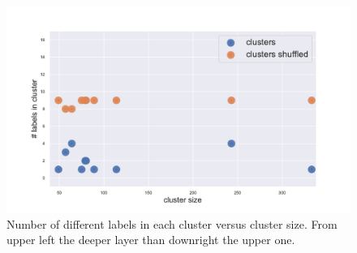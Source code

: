 \begin{figure}[htb!]
\begin{minipage}{0.45\textwidth}
    \end{minipage}
    \hspace{3mm}
    \begin{minipage}{0.45\textwidth}
    \includegraphics[width=0.9\linewidth]{pictures/topic/gtex/oversigma_10tissue/shuffledcluster_shuffle_label_size_l3_primary_site.pdf}
    \end{minipage}
\label{fig:topic/gtex/oversigma_10tissue/shuffledcluster_shuffle_label_size_l*}
\caption{Number of different labels in each cluster versus cluster size. From upper left the deeper layer than downright the upper one.}
\end{figure}

